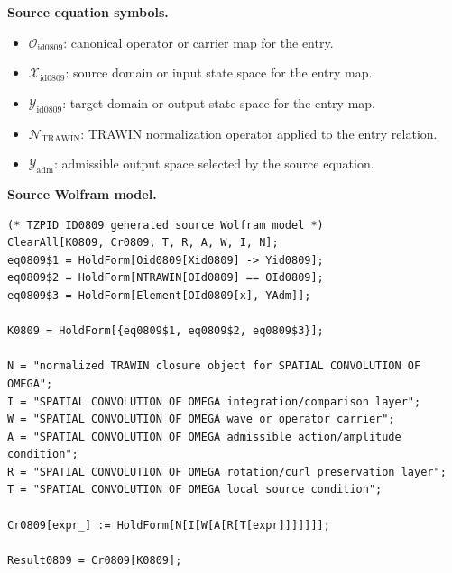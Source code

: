 \begin{minipage}[t]{0.49\linewidth}
\begingroup
\small
\raggedright
\textbf{Source equation symbols.}\par
\begin{itemize}[leftmargin=1.35em,itemsep=1pt,topsep=1pt,parsep=0pt]
    \item $\mathcal{O}_{\mathrm{id0809}}$: canonical operator or carrier map for the entry.
    \item $\mathcal{X}_{\mathrm{id0809}}$: source domain or input state space for the entry map.
    \item $\mathcal{Y}_{\mathrm{id0809}}$: target domain or output state space for the entry map.
    \item $\mathcal{N}_{\mathrm{TRAWIN}}$: TRAWIN normalization operator applied to the entry relation.
    \item $\mathcal{Y}_{\mathrm{adm}}$: admissible output space selected by the source equation.
\end{itemize}
\endgroup
\end{minipage}\hfill
\begin{minipage}[t]{0.47\linewidth}
\begingroup
\scriptsize
\raggedright
\textbf{Source Wolfram model.}\par
\begin{Verbatim}[fontsize=\tiny,breaklines=true,breakanywhere=true]
(* TZPID ID0809 generated source Wolfram model *)
ClearAll[K0809, Cr0809, T, R, A, W, I, N];
eq0809$1 = HoldForm[Oid0809[Xid0809] -> Yid0809];
eq0809$2 = HoldForm[NTRAWIN[OId0809] == OId0809];
eq0809$3 = HoldForm[Element[OId0809[x], YAdm]];

K0809 = HoldForm[{eq0809$1, eq0809$2, eq0809$3}];

N = "normalized TRAWIN closure object for SPATIAL CONVOLUTION OF OMEGA";
I = "SPATIAL CONVOLUTION OF OMEGA integration/comparison layer";
W = "SPATIAL CONVOLUTION OF OMEGA wave or operator carrier";
A = "SPATIAL CONVOLUTION OF OMEGA admissible action/amplitude condition";
R = "SPATIAL CONVOLUTION OF OMEGA rotation/curl preservation layer";
T = "SPATIAL CONVOLUTION OF OMEGA local source condition";

Cr0809[expr_] := HoldForm[N[I[W[A[R[T[expr]]]]]]];

Result0809 = Cr0809[K0809];
\end{Verbatim}
\endgroup
\end{minipage}

